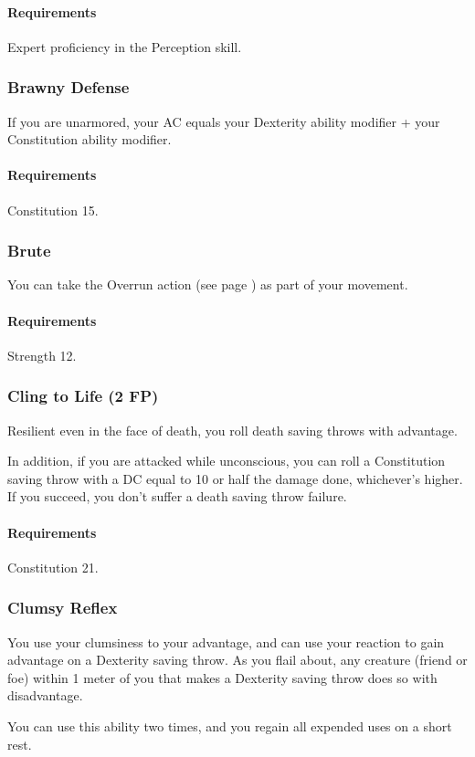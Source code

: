     \paragraph{Requirements} Expert proficiency in the Perception skill.
\subsubsection{Brawny Defense} \label{feat::brawnydefense}
    If you are unarmored, your AC equals your Dexterity ability modifier + your Constitution ability modifier.
    \paragraph{Requirements} Constitution 15.
\subsubsection{Brute} \label{feat::brute}
    You can take the Overrun action (see page \pageref{act::overrun}) as part of your movement.
    \paragraph{Requirements} Strength 12.
\subsubsection{Cling to Life (2 FP)} \label{feat::clingtolife}
    Resilient even in the face of death, you roll death saving throws with advantage.

    In addition, if you are attacked while unconscious, you can roll a Constitution saving throw with a DC equal to 10 or half the damage done, whichever's higher.
    If you succeed, you don't suffer a death saving throw failure.
    \paragraph{Requirements} Constitution 21.
\subsubsection{Clumsy Reflex} \label{feat::clumsyreflex}
    You use your clumsiness to your advantage, and can use your reaction to gain advantage on a Dexterity saving throw.
    As you flail about, any creature (friend or foe) within 1 meter of you that makes a Dexterity saving throw does so with disadvantage.

    You can use this ability two times, and you regain all expended uses on a short rest.

